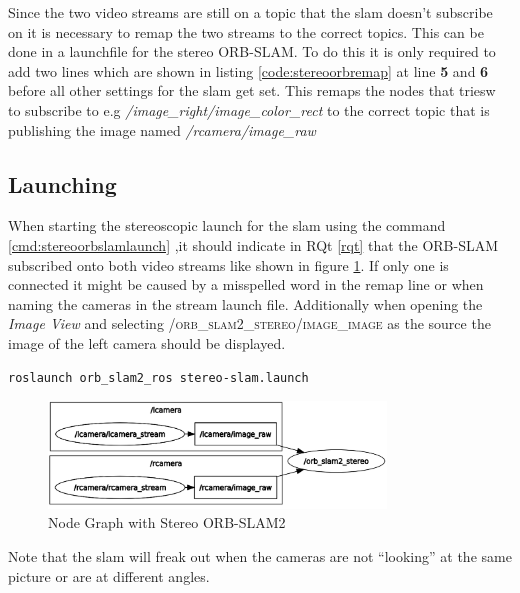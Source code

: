 Since the two video streams are still on a topic that the \gls{slam} doesn't subscribe on it is necessary to remap the two streams to the correct topics. This can be done in a launchfile for the stereo ORB-SLAM.
To do this it is only required to add two lines which are shown in listing \ref{code:stereoorbremap} at line \textbf{5} and \textbf{6} before all other settings for the \gls{slam} get set. This remaps the nodes that triesw to subscribe to e.g \textit{/image\_right/image\_color\_rect} to the correct topic that is publishing the image named \textit{/rcamera/image\_raw} \newline


\subsection{Launching}
When starting the stereoscopic launch for the \gls{slam} using the command \ref{cmd:stereoorbslamlaunch} ,it should indicate in RQt \ref{rqt} that the ORB-SLAM subscribed onto both video streams like shown in figure \ref{img:nodegraphstereoslam}. If only one is connected it might be caused by a misspelled word in the remap line or when naming the cameras in the stream launch file. Additionally when opening the \textit{Image View} and selecting \textsc{/orb\_slam2\_stereo/image\_image} as the source the image of the left camera should be displayed.\newline
\begin{lstlisting}[language=bash, label={cmd:stereoorbslamlaunch}]
    roslaunch orb_slam2_ros stereo-slam.launch
\end{lstlisting}
\begin{figure}[h]
	\centering
	\includegraphics[width=0.8\textwidth]{./media/images/nodegraphstereoorbslam.png}
  	\caption{Node Graph with Stereo ORB-SLAM2}
  	\label{img:nodegraphstereoslam}
\end{figure}
Note that the \gls{slam} will freak out when the cameras are not \enquote{looking} at the same picture or are at different angles.

